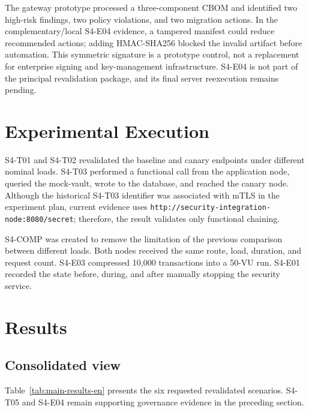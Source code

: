 \documentclass[12pt]{article}
\begin{document}
The gateway prototype processed a three-component CBOM and identified two high-risk findings, two policy violations, and two migration actions. In the complementary/local S4-E04 evidence, a tampered manifest could reduce recommended actions; adding HMAC-SHA256 blocked the invalid artifact before automation. This symmetric signature is a prototype control, not a replacement for enterprise signing and key-management infrastructure. S4-E04 is not part of the principal revalidation package, and its final server reexecution remains pending.

\section{Experimental Execution}
S4-T01 and S4-T02 revalidated the baseline and canary endpoints under different nominal loads. S4-T03 performed a functional call from the application node, queried the mock-vault, wrote to the database, and reached the canary node. Although the historical S4-T03 identifier was associated with mTLS in the experiment plan, current evidence uses \texttt{http://security-integration-node:8080/secret}; therefore, the result validates only functional chaining.

S4-COMP was created to remove the limitation of the previous comparison between different loads. Both nodes received the same route, load, duration, and request count. S4-E03 compressed 10,000 transactions into a 50-VU run. S4-E01 recorded the state before, during, and after manually stopping the security service.

\section{Results}
\subsection{Consolidated view}
Table~\ref{tab:main-results-en} presents the six requested revalidated scenarios. S4-T05 and S4-E04 remain supporting governance evidence in the preceding section.
\end{document}
